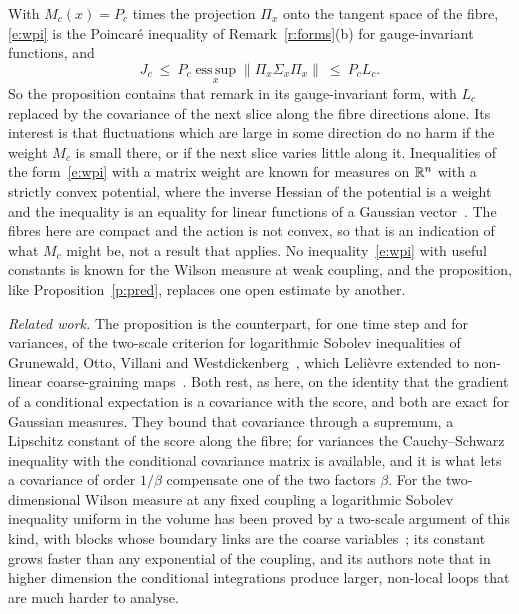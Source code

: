 With $M_c(x)=P_c$ times the projection $\Pi_x$ onto the tangent space of the fibre, \eqref{e:wpi} is the
Poincar\'e inequality of Remark~\ref{r:forms}(b) for gauge-invariant functions, and
\[J_c\ \le\ P_c\operatorname*{ess\,sup}_x\|\Pi_x\Sigma_x\Pi_x\|\ \le\ P_cL_c .\]
So the proposition contains that
remark in its gauge-invariant form, with $L_c$ replaced by the covariance of the next slice along the fibre
directions alone. Its interest is that fluctuations which are large in some direction do no harm if the
weight $M_c$ is small there, or if the next slice varies little along it. Inequalities of the
form~\eqref{e:wpi} with a matrix weight are known for measures on $\mathbb{R}^n$ with a strictly convex potential,
where the inverse Hessian of the potential is a weight and the inequality is an equality for linear
functions of a Gaussian vector~\cite{BL76}. The fibres here are compact and the action is not convex, so
that is an indication of what $M_c$ might be, not a result that applies. No inequality~\eqref{e:wpi} with
useful constants is known for the Wilson measure at weak coupling, and the proposition, like
Proposition~\ref{p:pred}, replaces one open estimate by another.

\emph{Related work.} The proposition is the counterpart, for one time step and for variances, of the
two-scale criterion for logarithmic Sobolev inequalities of Grunewald, Otto, Villani and
Westdickenberg~\cite{GOVW09}, which Leli\`evre extended to non-linear coarse-graining maps~\cite{Lel09}. Both
rest, as here, on the identity that the gradient of a conditional expectation is a covariance with the
score, and both are exact for Gaussian measures. They bound that covariance through a supremum, a
Lipschitz constant of the score along the fibre; for variances the Cauchy--Schwarz inequality with the
conditional covariance matrix is available, and it is what lets a covariance of order $1/\beta$ compensate
one of the two factors $\beta$. For the two-dimensional Wilson measure at any fixed coupling a logarithmic
Sobolev inequality uniform in the volume has been proved by a two-scale argument of this kind, with blocks
whose boundary links are the coarse variables~\cite{PS26}; its constant grows faster than any exponential of
the coupling, and its authors note that in higher dimension the conditional integrations produce larger,
non-local loops that are much harder to analyse.

